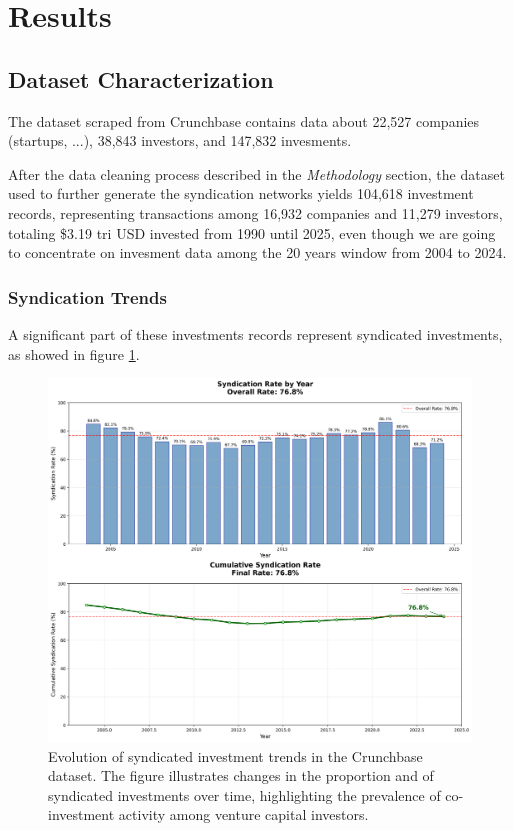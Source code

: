 \section{Results}

\subsection{Dataset Characterization}

The dataset scraped from Crunchbase contains data about 22,527 companies (startups, ...), 38,843 investors, and 147,832 invesments.

After the data cleaning process described in the \textit{Methodology} section, the dataset used to further generate the syndication networks yields 104,618 investment records, representing transactions among 16,932 companies and 11,279 investors, totaling \$3.19 tri USD invested from 1990 until 2025, even though we are going to concentrate on invesment data among the 20 years window from 2004 to 2024.

\subsubsection{Syndication Trends}

A significant part of these investments records represent syndicated investments, as showed in figure \ref{fig:syndication_evolution}.

\begin{figure}[htbp]
\centering
\includegraphics[width=1\textwidth]{../figures/us/syndication_trends.png}
\caption{Evolution of syndicated investment trends in the Crunchbase dataset. The figure illustrates changes in the proportion and of syndicated investments over time, highlighting the prevalence of co-investment activity among venture capital investors.}
\label{fig:syndication_evolution}
\end{figure}

